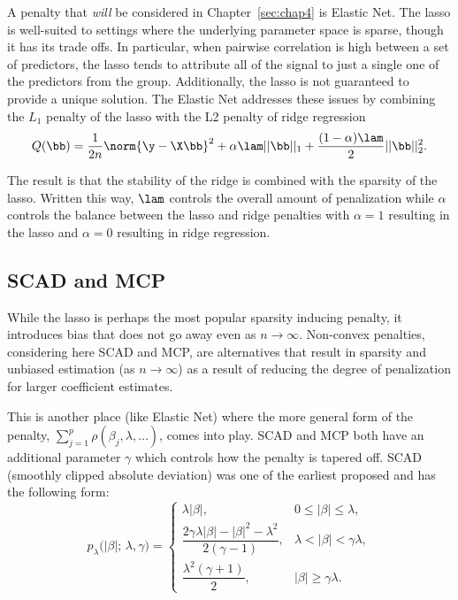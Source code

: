 A penalty that \emph{will} be considered in Chapter~\ref{sec:chap4} is Elastic Net. The lasso is well-suited to settings where the underlying parameter space is sparse, though it has its trade offs. In particular, when pairwise correlation is high between a set of predictors, the lasso tends to attribute all of the signal to just a single one of the predictors from the group. Additionally, the lasso is not guaranteed to provide a unique solution. The Elastic Net addresses these issues by combining the $L_1$ penalty of the lasso with the L2 penalty of ridge regression
$$
Q(\bb) = \frac{1}{2n}\norm{\y - \X\bb}^2 +  \alpha \lam ||\bb||_1 + \frac{(1 - \alpha) \lam }{2} ||\bb||^2_2.
$$

The result is that the stability of the ridge is combined with the sparsity of the lasso. Written this way, $\lam$ controls the overall amount of penalization while $\alpha$ controls the balance between the lasso and ridge penalties with $\alpha = 1$ resulting in the lasso and $\alpha = 0$ resulting in ridge regression.

\subsection{SCAD and MCP}

While the lasso is perhaps the most popular sparsity inducing penalty, it introduces bias that does not go away even as $n \rightarrow \infty$. Non-convex penalties, considering here SCAD and MCP, are alternatives that result in sparsity and unbiased estimation (as $n \rightarrow \infty$) as a result of reducing the degree of penalization for larger coefficient estimates. 

This is another place (like Elastic Net) where the more general form of the penalty, $\sum_{j = 1}^p \rho(\beta_j, \lambda, \ldots)$, comes into play. SCAD and MCP both have an additional parameter $\gamma$ which controls how the penalty is tapered off. SCAD (smoothly clipped absolute deviation) was one of the earliest proposed and has the following form:
$$
\displaystyle
p_\lambda\!\bigl(|\beta|;\,\lambda,\gamma\bigr)=
\begin{cases}
\lambda|\beta|, &
0 \le |\beta| \le \lambda, \\[4pt]
\dfrac{2\gamma\lambda|\beta| - |\beta|^{2} - \lambda^{2}}
      {2(\gamma-1)}, &
\lambda < |\beta| < \gamma\lambda, \\[10pt]
\dfrac{\lambda^{2}(\gamma+1)}{2}, &
|\beta| \ge \gamma\lambda.
\end{cases} 
$$

